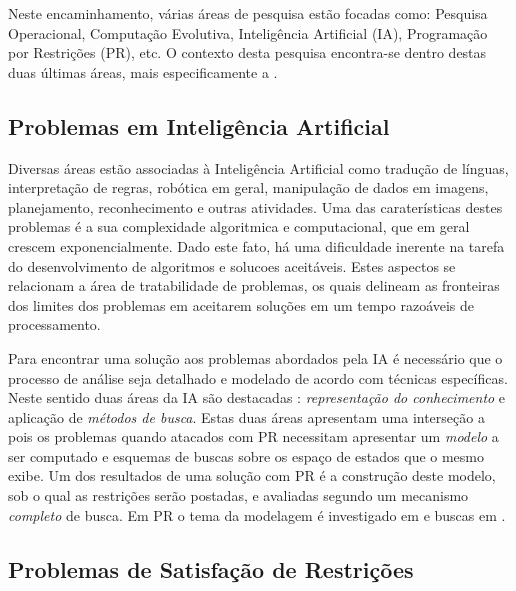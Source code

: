 Neste encaminhamento, várias áreas de pesquisa  estão focadas como: Pesquisa
Operacional, Computação Evolutiva, Inteligência Artificial (IA), Programação por
Restrições (PR), etc. O contexto desta pesquisa encontra-se dentro destas duas 
últimas áreas, mais especificamente a \PR .


\subsection{Problemas em Inteligência Artificial}

Diversas áreas estão associadas à Inteligência Artificial como tradução de línguas, interpretação de regras, robótica em geral,  manipulação de dados em imagens,
 planejamento, reconhecimento  e outras atividades. Uma das caraterísticas destes problemas 
é a sua complexidade algoritmica e computacional, que em geral crescem exponencialmente.
Dado este fato, há uma dificuldade inerente na tarefa do desenvolvimento de algoritmos
 e solucoes aceitáveis. Estes aspectos se relacionam a área de tratabilidade de problemas,
 os quais delineam as fronteiras dos limites dos problemas em aceitarem
 soluções em um tempo razoáveis de processamento.


Para encontrar uma solução  aos problemas abordados pela IA é necessário que o processo de análise seja detalhado e modelado de 
acordo com técnicas específicas. Neste sentido duas áreas da IA são destacadas \cite{RusNorv2010}: \textit{representação do 
conhecimento}  e aplicação de \textit{métodos de busca}. Estas duas áreas apresentam uma interseção a \PR  pois os problemas quando 
atacados com PR necessitam apresentar um \textit{modelo} a ser computado e esquemas
de buscas sobre os espaço de estados que o mesmo exibe. Um dos  resultados
de uma solução com PR é a construção deste modelo, sob o qual as restrições serão
postadas, e avaliadas segundo um mecanismo \textit{completo} de busca.
 Em PR o tema da modelagem 
é investigado em \cite{smith_2006} e buscas em \cite{beek_2006,hoos_2006}.



\subsection{Problemas de Satisfação de Restrições}
\label{sec:ch_cp}


